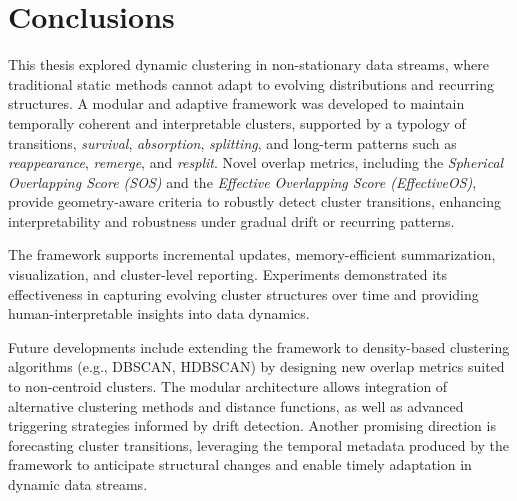 \section{Conclusions}

This thesis explored dynamic clustering in non-stationary data streams, where
traditional static methods cannot adapt to evolving distributions and recurring
structures. A modular and adaptive framework was developed to maintain
temporally coherent and interpretable clusters, supported by a typology of
transitions, \emph{survival}, \emph{absorption}, \emph{splitting}, and long-term
patterns such as \emph{reappearance}, \emph{remerge}, and \emph{resplit}. Novel
overlap metrics, including the \emph{Spherical Overlapping Score (SOS)} and the
\emph{Effective Overlapping Score (EffectiveOS)}, provide geometry-aware criteria to robustly
detect cluster transitions, enhancing interpretability and robustness under
gradual drift or recurring patterns.

The framework supports incremental updates, memory-efficient summarization,
visualization, and cluster-level reporting. Experiments demonstrated its
effectiveness in capturing evolving cluster structures over time and providing
human-interpretable insights into data dynamics.

Future developments include extending the framework to density-based clustering
algorithms (e.g., DBSCAN, HDBSCAN) by designing new overlap metrics suited to
non-centroid clusters. The modular architecture allows integration of
alternative clustering methods and distance functions, as well as advanced
triggering strategies informed by drift detection. Another promising direction
is forecasting cluster transitions, leveraging the temporal metadata produced
by the framework to anticipate structural changes and enable timely
adaptation in dynamic data streams.
